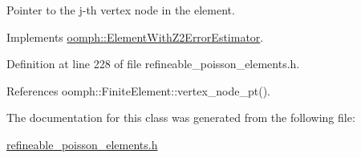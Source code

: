 Pointer to the j-\/th vertex node in the element. 



Implements \hyperlink{classoomph_1_1ElementWithZ2ErrorEstimator_a0eedccc33519f852c5dc2055ddf2774b}{oomph\+::\+Element\+With\+Z2\+Error\+Estimator}.



Definition at line 228 of file refineable\+\_\+poisson\+\_\+elements.\+h.



References oomph\+::\+Finite\+Element\+::vertex\+\_\+node\+\_\+pt().



The documentation for this class was generated from the following file\+:\begin{DoxyCompactItemize}
\item 
\hyperlink{refineable__poisson__elements_8h}{refineable\+\_\+poisson\+\_\+elements.\+h}\end{DoxyCompactItemize}
